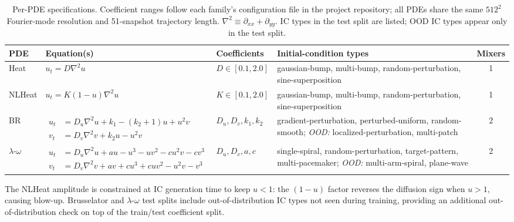 \documentclass[10pt,journal,compsoc]{IEEEtran}
\begin{document}
\begin{table}[!t]
\centering
\caption{Per-PDE specifications. Coefficient ranges follow each family's
configuration file in the project repository; all PDEs share the same
$512^2$ Fourier-mode resolution and 51-snapshot trajectory length.
$\nabla^2 \equiv \partial_{xx} + \partial_{yy}$. IC types in the test
split are listed; OOD IC types appear only in the test split.}
\label{tab:pde_specs}
\small
\begin{tabular}{@{}lll>{\raggedright\arraybackslash}p{4cm}c@{}}
\toprule
PDE & Equation(s) & Coefficients & Initial-condition types & Mixers \\
\midrule
Heat & $u_t = D \nabla^2 u$
     & $D \in [0.1, 2.0]$
     & gaussian-bump, multi-bump, random-perturbation,
       sine-superposition
     & 1 \\
NLHeat & $u_t = K(1-u)\nabla^2 u$
     & $K \in [0.1, 2.0]$
     & gaussian-bump, multi-bump, random-perturbation,
       sine-superposition
     & 1 \\
BR
     & $\begin{aligned}
        u_t &= D_u \nabla^2 u + k_1 - (k_2+1)u + u^2 v \\
        v_t &= D_v \nabla^2 v + k_2 u - u^2 v
       \end{aligned}$
     & $D_u, D_v, k_1, k_2$
     & gradient-perturbation, perturbed-uniform, random-smooth;
       \emph{OOD:} localized-perturbation, multi-patch
     & 2 \\
$\lambda$-$\omega$
     & $\begin{aligned}
        u_t &= D_u \nabla^2 u + a u - u^3 - u v^2 - c u^2 v - c v^3 \\
        v_t &= D_v \nabla^2 v + a v + c u^3 + c u v^2 - u^2 v - v^3
       \end{aligned}$
     & $D_u, D_v, a, c$
     & single-spiral, random-perturbation, target-pattern,
       multi-pacemaker; \emph{OOD:} multi-arm-spiral, plane-wave
     & 2 \\
\bottomrule
\end{tabular}
\end{table}

The NLHeat amplitude is constrained at IC generation time to keep $u < 1$:
the $(1-u)$ factor reverses the diffusion sign when $u > 1$, causing
blow-up. Brusselator and $\lambda$-$\omega$ test splits include
out-of-distribution IC types not seen during training, providing an
additional out-of-distribution check on top of the train/test coefficient
split.
\end{document}
